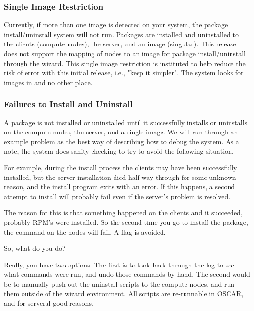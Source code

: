 
\subsubsection{Single Image Restriction}
\label{det:single-image-restriction}

Currently, if more than one image is detected on your system, the package
install/uninstall system will not run.  Packages are installed and
uninstalled to the clients (compute nodes), the server, and an image
(singular).  This release does not support the mapping of nodes to an
image for package install/uninstall through the wizard.  This single
image restriction is instituted to help reduce the risk of error with this
initial release, i.e., "keep it simpler".  The system looks for images in
 and no other place.


\subsubsection{Failures to Install and Uninstall}
\label{det:failures-install-uninstall}

A package is not installed or uninstalled until it successfully installs or
uninstalls on the compute nodes, the server, and a single image.  We will
run through an example problem as the best way of describing how to debug
the system.  As a note, the system does sanity checking to try to avoid the
following situation.

For example, during the install process the clients may have been successfully
installed, but the server installation died half way through for some unknown
reason, and the install program exits with an error.  If this happens, a
second attempt to install will probably fail even if the server's problem
is resolved.

The reason for this is that something happened on the clients and it
succeeded, probably RPM's were installed.  So the second time you go to
install the package, the  command on the nodes will fail.
A  flag is avoided.

So, what do you do?

Really, you have two options.  The first is to look back through the log to
see what commands were run, and undo those commands by hand.  The second
would be to manually push out the uninstall scripts to the compute nodes,
and run them outside of the wizard environment.  All scripts are re-runnable
in OSCAR, and for serveral good reasons.

